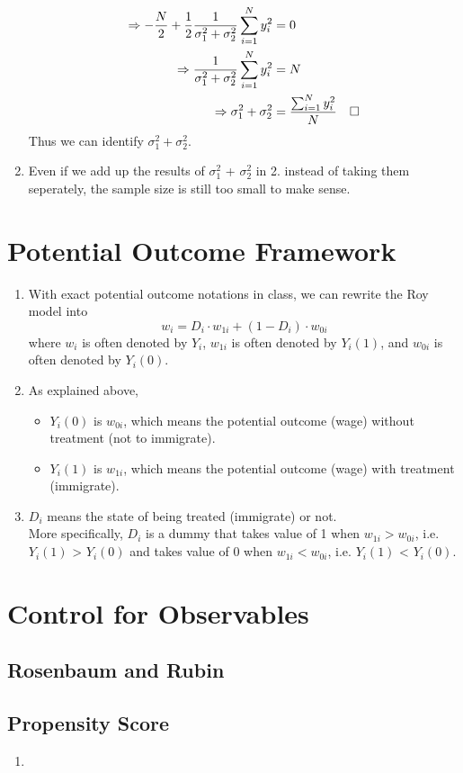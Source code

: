 \documentclass[12pt]{article}
\newcommand*{\QEDA}{\null\nobreak\hfill\ensuremath{\square}}%
\begin{document}
\begin{enumerate}
\begin{align}
            \Rightarrow -\frac{N}{2} + \frac{1}{2} \frac{1}{\sigma^2_1 + \sigma^2_2} \sum_{i = 1}^{N}y_i^2 & = 0 & \nonumber \\ 
            \Rightarrow \frac{1}{\sigma^2_1 + \sigma^2_2} \sum_{i = 1}^{N}y_i^2 & = N & \nonumber \\ 
            \Rightarrow \sigma^2_1 + \sigma^2_2 & = \frac{\sum_{i = 1}^{N}y_i^2}{N} & \nonumber \QEDA
            \end{align}
            Thus we can identify $\sigma^2_1 + \sigma^2_2$.
      \item Even if we add up the results of $\sigma^2_1$ + $\sigma^2_2$ in 2. instead of taking them seperately, the sample size is still too small to make sense.
\end{enumerate}

\section{Potential Outcome Framework} \label{POF}
\begin{enumerate}
      \item With exact potential outcome notations in class, we can rewrite the Roy model into 
            $$w_i = D_i \cdot w_{1i} + (1 - D_i) \cdot w_{0i}$$
            where $w_i$ is often denoted by $Y_i$, $w_{1i}$ is often denoted by $Y_i(1)$, and $w_{0i}$ is often denoted by $Y_i(0)$.
      \item As explained above, 
      \begin{itemize}
            \item $Y_i(0)$ is $w_{0i}$, which means the potential outcome (wage) without treatment (not to immigrate).
            \item $Y_i(1)$ is $w_{1i}$, which means the potential outcome (wage) with treatment (immigrate).
      \end{itemize}
      \item $D_i$ means the state of being treated (immigrate) or not. \\ 
            More specifically, $D_i$ is a dummy that takes value of 1 when $w_{1i} > w_{0i}$, i.e. $Y_i(1)$ > $Y_i(0)$ 
            and takes value of 0 when $w_{1i} < w_{0i}$, i.e. $Y_i(1)$ < $Y_i(0)$.
\end{enumerate}

\section{Control for Observables} \label{control}
\subsection{Rosenbaum and Rubin} \label{RR}

\subsection{Propensity Score} \label{PS}
\begin{enumerate}
      \item 
\end{enumerate}
\end{document}
